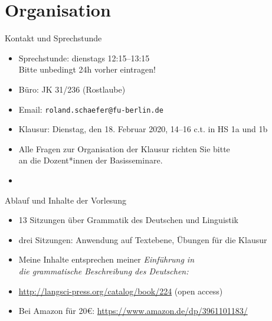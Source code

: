 
\section{Organisation}

\begin{frame}
  {Kontakt und Sprechstunde}
  \begin{itemize}
    \item Sprechstunde: dienstags 12:15--13:15\\
      \alert{Bitte unbedingt 24h vorher eintragen!}
    \item Büro: JK 31/236 (Rostlaube)
    \item Email: \texttt{roland.schaefer@fu-berlin.de}
      \vspace{\baselineskip}
    \item Klausur: Dienstag, den 18. Februar 2020, 14–16 c.t. in HS 1a und 1b\\
      \vspace{\baselineskip}
    \item \alert{Alle Fragen zur Organisation der Klausur richten Sie bitte\\
      an die Dozent*innen der Basisseminare.}
      \vspace{\baselineskip}
    \item {}
  \end{itemize}
\end{frame}


\begin{frame}
  {Ablauf und Inhalte der Vorlesung}
  \begin{itemize}
    \item 13 Sitzungen über Grammatik des Deutschen und Linguistik
    \item drei Sitzungen: Anwendung auf Textebene, Übungen für die Klausur 
      \vspace{\baselineskip}
    \item Meine Inhalte entsprechen meiner \alert{\textit{Einführung in\\
      die grammatische Beschreibung des Deutschen:}}\\
    \item \url{http://langsci-press.org/catalog/book/224} (\alert{open access})
      \vspace{\baselineskip}
    \item Bei Amazon für 20€: \url{https://www.amazon.de/dp/3961101183/}
  \end{itemize}
\end{frame}

